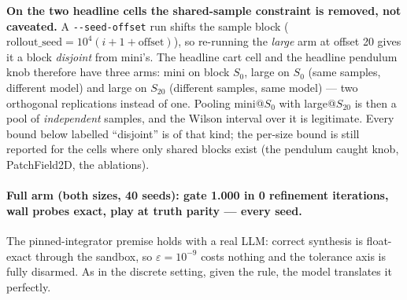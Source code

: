 \documentclass[11pt]{article}
\theoremstyle{definition}
\theoremstyle{remark}
\begin{document}
\textbf{On the two headline cells the shared-sample constraint is removed, not caveated.} A \texttt{-{}-seed-offset} run shifts the sample block ($\mathrm{rollout\_seed} = 10^4(i{+}1{+}\mathrm{offset})$), so re-running the \emph{large} arm at offset 20 gives it a block \emph{disjoint} from mini's. The headline cart cell and the headline pendulum knob therefore have three arms: mini on block $S_0$, large on $S_0$ (same samples, different model) and large on $S_{20}$ (different samples, same model) --- two orthogonal replications instead of one. Pooling mini@$S_0$ with large@$S_{20}$ is then a pool of \emph{independent} samples, and the Wilson interval over it is legitimate. Every bound below labelled ``disjoint'' is of that kind; the per-size bound is still reported for the cells where only shared blocks exist (the pendulum caught knob, PatchField2D, the ablations).

\paragraph{Full arm (both sizes, 40 seeds): gate 1.000 in 0 refinement iterations, wall probes exact, play at truth parity --- every seed.} The pinned-integrator premise holds with a real LLM: correct synthesis is float-exact through the sandbox, so $\varepsilon = 10^{-9}$ costs nothing and the tolerance axis is fully disarmed. As in the discrete setting, given the rule, the model translates it perfectly.
\end{document}
